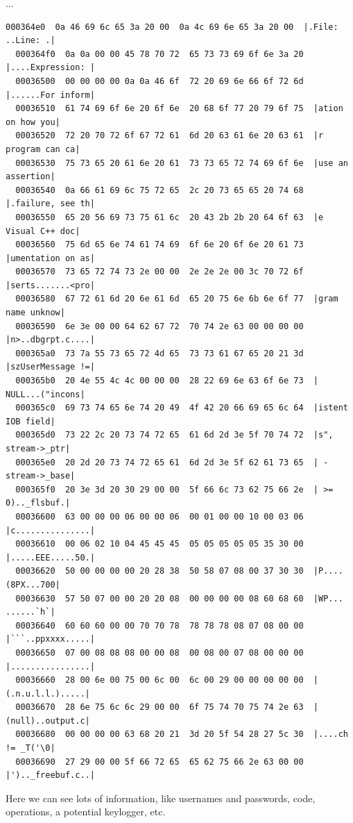 \documentclass[]{project_plan}
\begin{document}
...
\begin{lstlisting}[basicstyle=\tiny]
  000364e0  0a 46 69 6c 65 3a 20 00  0a 4c 69 6e 65 3a 20 00  |.File: ..Line: .|
  000364f0  0a 0a 00 00 45 78 70 72  65 73 73 69 6f 6e 3a 20  |....Expression: |
  00036500  00 00 00 00 0a 0a 46 6f  72 20 69 6e 66 6f 72 6d  |......For inform|
  00036510  61 74 69 6f 6e 20 6f 6e  20 68 6f 77 20 79 6f 75  |ation on how you|
  00036520  72 20 70 72 6f 67 72 61  6d 20 63 61 6e 20 63 61  |r program can ca|
  00036530  75 73 65 20 61 6e 20 61  73 73 65 72 74 69 6f 6e  |use an assertion|
  00036540  0a 66 61 69 6c 75 72 65  2c 20 73 65 65 20 74 68  |.failure, see th|
  00036550  65 20 56 69 73 75 61 6c  20 43 2b 2b 20 64 6f 63  |e Visual C++ doc|
  00036560  75 6d 65 6e 74 61 74 69  6f 6e 20 6f 6e 20 61 73  |umentation on as|
  00036570  73 65 72 74 73 2e 00 00  2e 2e 2e 00 3c 70 72 6f  |serts.......<pro|
  00036580  67 72 61 6d 20 6e 61 6d  65 20 75 6e 6b 6e 6f 77  |gram name unknow|
  00036590  6e 3e 00 00 64 62 67 72  70 74 2e 63 00 00 00 00  |n>..dbgrpt.c....|
  000365a0  73 7a 55 73 65 72 4d 65  73 73 61 67 65 20 21 3d  |szUserMessage !=|
  000365b0  20 4e 55 4c 4c 00 00 00  28 22 69 6e 63 6f 6e 73  | NULL...("incons|
  000365c0  69 73 74 65 6e 74 20 49  4f 42 20 66 69 65 6c 64  |istent IOB field|
  000365d0  73 22 2c 20 73 74 72 65  61 6d 2d 3e 5f 70 74 72  |s", stream->_ptr|
  000365e0  20 2d 20 73 74 72 65 61  6d 2d 3e 5f 62 61 73 65  | - stream->_base|
  000365f0  20 3e 3d 20 30 29 00 00  5f 66 6c 73 62 75 66 2e  | >= 0).._flsbuf.|
  00036600  63 00 00 00 06 00 00 06  00 01 00 00 10 00 03 06  |c...............|
  00036610  00 06 02 10 04 45 45 45  05 05 05 05 05 35 30 00  |.....EEE.....50.|
  00036620  50 00 00 00 00 20 28 38  50 58 07 08 00 37 30 30  |P.... (8PX...700|
  00036630  57 50 07 00 00 20 20 08  00 00 00 00 08 60 68 60  |WP...  ......`h`|
  00036640  60 60 60 00 00 70 70 78  78 78 78 08 07 08 00 00  |```..ppxxxx.....|
  00036650  07 00 08 08 08 00 00 08  00 08 00 07 08 00 00 00  |................|
  00036660  28 00 6e 00 75 00 6c 00  6c 00 29 00 00 00 00 00  |(.n.u.l.l.).....|
  00036670  28 6e 75 6c 6c 29 00 00  6f 75 74 70 75 74 2e 63  |(null)..output.c|
  00036680  00 00 00 00 63 68 20 21  3d 20 5f 54 28 27 5c 30  |....ch != _T('\0|
  00036690  27 29 00 00 5f 66 72 65  65 62 75 66 2e 63 00 00  |').._freebuf.c..|
\end{lstlisting}

Here we can see lots of information, like usernames and passwords, code,
operations, a potential keylogger, etc.
\end{document}
